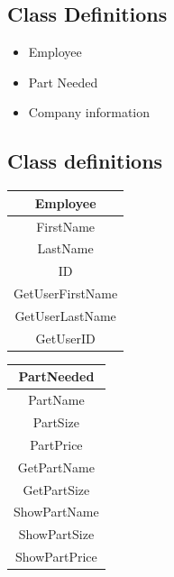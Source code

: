 \subsection{Class Definitions}
\begin{itemize}
	\item Employee
	\item Part Needed
	\item Company information
\end{itemize}

\subsection{Class definitions}
\begin{center}
\begin{tabular}{ |c| }
\hline
\textbf{Employee}\\
\hline
FirstName\\
LastName\\
ID\\
\hline
GetUserFirstName\\
GetUserLastName\\
GetUserID\\
\hline
\end{tabular}
\end{center}
\begin{center}
\begin{tabular}{ |c| }
\hline
\textbf{PartNeeded}\\
\hline
PartName\\
PartSize\\
PartPrice\\
\hline
GetPartName\\
GetPartSize\\
ShowPartName\\
ShowPartSize\\
ShowPartPrice\\
\hline
\end{tabular}
\end{center}
